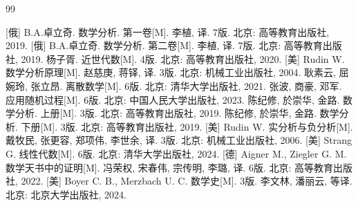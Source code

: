 \documentclass[cn,toc=twocol]{elegantbook}
\begin{document}


\begin{thebibliography}{99}  

[俄] B.A.卓立奇. 数学分析. 第一卷[M]. 李植, 译. 7版. 北京: 高等教育出版社, 2019.
[俄] B.A.卓立奇. 数学分析. 第二卷[M]. 李植, 译. 7版. 北京: 高等教育出版社, 2019.
 杨子胥. 近世代数[M]. 4版. 北京: 高等教育出版社,  2020.
[美] Rudin W. 数学分析原理[M]. 赵慈庚, 蒋铎, 译. 3版. 北京: 机械工业出版社, 2004.
 耿素云, 屈婉玲, 张立昂. 离散数学[M]. 6版. 北京: 清华大学出版社, 2021.
 张波, 商豪, 邓军. 应用随机过程[M]. 6版. 北京: 中国人民大学出版社, 2023.
 陈纪修, 於崇华, 金路. 数学分析. 上册[M]. 3版. 北京: 高等教育出版社, 2019.
 陈纪修, 於崇华, 金路. 数学分析. 下册[M]. 3版. 北京: 高等教育出版社, 2019.
 [美] Rudin W. 实分析与负分析[M]. 戴牧民, 张更容, 郑项伟, 李世余, 译. 3版. 北京: 机械工业出版社, 2006.
 [美] Strang G. 线性代数[M]. 6版. 北京: 清华大学出版社, 2024.
 [德] Aigner M., Ziegler G. M. 数学天书中的证明[M]. 冯荣权, 宋春伟, 宗传明, 李璐, 译. 6版. 北京: 高等教育出版社, 2022.
 [美] Boyer C. B., Merzbach U. C. 数学史[M]. 3版. 李文林, 潘丽云, 等译. 北京: 北京大学出版社, 2024.

\end{thebibliography}
\end{document}
